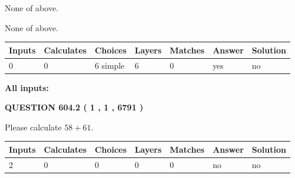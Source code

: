 \documentclass[12pt]{article}
\begin{document}
 
 None of above.
 
 
\noindent{}
 
 
 None of above.
 
 
\noindent{}
 
 
   
   
   
   
\noindent\begin{tabular}{|l|l|l|l|l|l|l|}
 \hline
Inputs & Calculates & Choices & Layers & Matches & Answer & Solution \\ \hline
 0  & 
 0  & 
 6
  simple  
  & 
 6  & 
 0  & 
  yes & 
  no 
  \\ \hline
 \end{tabular}
   
   
   
   
\noindent{}
   
   
   
   
\noindent\vspace{0.1in}\hspace{-0.08in} {\textbf{\Large{All inputs: }}}
   
   
  
\vspace{0.2in}
  
{\textbf{\Large{QUESTION
604.2 
 ( 1 , 1 , 6791 )
}}}
  
  
 
Please calculate $ %
58 +  %
61 $.
 
 
   
   
   
   
\noindent\begin{tabular}{|l|l|l|l|l|l|l|}
 \hline
Inputs & Calculates & Choices & Layers & Matches & Answer & Solution \\ \hline
 2  & 
 0  & 
 0
  & 
 0  & 
 0  & 
  no & 
  no 
  \\ \hline
 \end{tabular}
   
   
   
   
\noindent{}
   
   
   
\end{document}
